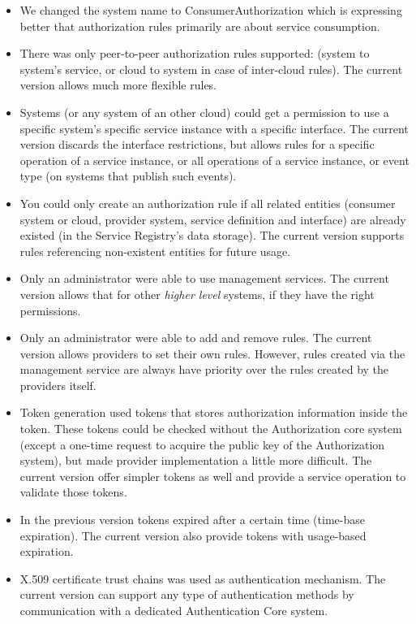 \documentclass[a4paper]{arrowhead}
\begin{document}
\begin{itemize}
    \item We changed the system name to ConsumerAuthorization which is expressing better that authorization rules primarily are about service consumption. 
    \item There was only peer-to-peer authorization rules supported: (system to system's service, or cloud to system in case of inter-cloud rules). The current version allows much more flexible rules.
    \item Systems (or any system of an other cloud) could get a permission to use a specific system's specific service instance with a specific interface. The current version discards the interface restrictions, but allows rules for a specific operation of a service instance, or all operations of a service instance, or event type (on systems that publish such events). 
    \item You could only create an authorization rule if all related entities (consumer system or cloud, provider system, service definition and interface) are already existed (in the Service Registry's data storage). The current version supports rules referencing non-existent entities for future usage.
    \item Only an administrator were able to use management services. The current version allows that for other \textit{higher level} systems, if they have the right permissions.
    \item Only an administrator were able to add and remove rules. The current version allows providers to set their own rules. However, rules created via the management service are always have priority over the rules created by the providers itself.
    \item Token generation used tokens that stores authorization information inside the token. These tokens could be checked without the Authorization core system (except a one-time request to acquire the public key of the Authorization system), but made provider implementation a little more difficult. The current version offer simpler tokens as well and provide a service operation to validate those tokens.
    \item In the previous version tokens expired after a certain time (time-base expiration). The current version also provide tokens with usage-based expiration.
    \item X.509 certificate trust chains was used as authentication mechanism. The current version can support any type of authentication methods by communication with a dedicated Authentication Core system.
\end{itemize}
\end{document}
